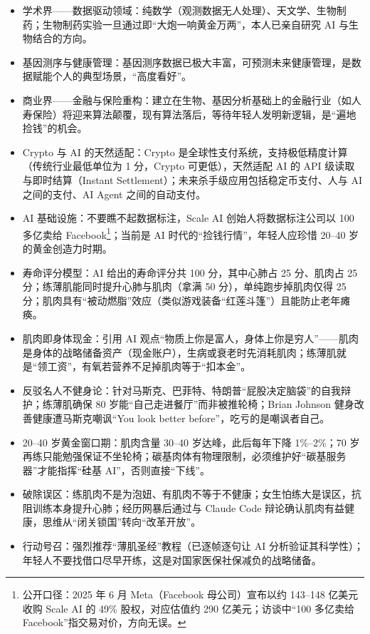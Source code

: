 \begin{itemize}
\tightlist
\item
  学术界------数据驱动领域：纯数学（观测数据无人处理）、天文学、生物制药；生物制药实验一旦通过即``大炮一响黄金万两''，本人已亲自研究
  AI 与生物结合的方向。
\item
  基因测序与健康管理：基因测序数据已极大丰富，可预测未来健康管理，是数据赋能个人的典型场景，``高度看好''。
\item
  商业界------金融与保险重构：建立在生物、基因分析基础上的金融行业（如人寿保险）将迎来算法颠覆，现有算法落后，等待年轻人发明新逻辑，是``遍地捡钱''的机会。
\item
  Crypto 与 AI 的天然适配：Crypto
  是全球性支付系统，支持极低精度计算（传统行业最低单位为 1 分，Crypto
  可更低），天然适配 AI 的 API 级读取与即时结算（Instant
  Settlement）；未来杀手级应用包括稳定币支付、人与 AI 之间的支付、AI
  Agent 之间的自动支付。
\item
  AI 基础设施：不要瞧不起数据标注，Scale AI 创始人将数据标注公司以 100
  多亿卖给 Facebook\footnote{公开口径：2025 年 6 月 Meta（Facebook
    母公司）宣布以约 143--148 亿美元收购 Scale AI 的 49\%
    股权，对应估值约 290 亿美元；访谈中``100 多亿卖给
    Facebook''指交易对价，方向无误。}；当前是 AI
  时代的``捡钱行情''，年轻人应珍惜 20--40 岁的黄金创造力时期。
\item
  寿命评分模型：AI 给出的寿命评分共 100 分，其中心肺占 25 分、肌肉占 25
  分；练薄肌能同时提升心肺与肌肉（拿满 50 分），单纯跑步掉肌肉仅得 25
  分；肌肉具有``被动燃脂''效应（类似游戏装备``红莲斗篷''）且能防止老年瘫痪。
\item
  肌肉即身体现金：引用 AI
  观点``物质上你是富人，身体上你是穷人''------肌肉是身体的战略储备资产（现金账户），生病或衰老时先消耗肌肉；练薄肌就是``领工资''，有氧若营养不足掉肌肉等于``扣本金''。
\item
  反驳名人不健身论：针对马斯克、巴菲特、特朗普``屁股决定脑袋''的自我辩护；练薄肌确保
  80 岁能``自己走进餐厅''而非被推轮椅；Brian Johnson
  健身改善健康遭马斯克嘲讽``You look better
  before''，吃亏的是嘲讽者自己。
\item
  20--40 岁黄金窗口期：肌肉含量 30--40 岁达峰，此后每年下降 1\%--2\%；70
  岁再练只能勉强保证不坐轮椅；碳基肉体有物理限制，必须维护好``碳基服务器''才能指挥``硅基
  AI''，否则直接``下线''。
\item
  破除误区：练肌肉不是为泡妞、有肌肉不等于不健康；女生怕练大是误区，抗阻训练本身提升心肺；经历网暴后通过与
  Claude Code 辩论确认肌肉有益健康，思维从``闭关锁国''转向``改革开放''。
\item
  行动号召：强烈推荐``薄肌圣经''教程（已逐帧逐句让 AI
  分析验证其科学性）；年轻人不要找借口尽早开练，这是对国家医保社保减负的战略储备。
\end{itemize}

